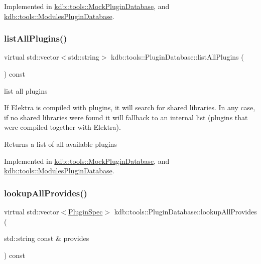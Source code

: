 Implemented in \mbox{\hyperlink{classkdb_1_1tools_1_1MockPluginDatabase_a5a701fd310be0e9f7d14a865c0226517}{kdb\+::tools\+::\+Mock\+Plugin\+Database}}, and \mbox{\hyperlink{classkdb_1_1tools_1_1ModulesPluginDatabase_a0e81e1b7b296a52f8040fd966b461c3a}{kdb\+::tools\+::\+Modules\+Plugin\+Database}}.

\mbox{\label{classkdb_1_1tools_1_1PluginDatabase_adc1f43ccefdd7fc15a57db7571420642}} 
\subsubsection{\texorpdfstring{listAllPlugins()}{listAllPlugins()}}
{\footnotesize\ttfamily virtual std\+::vector$<$std\+::string$>$ kdb\+::tools\+::\+Plugin\+Database\+::list\+All\+Plugins (\begin{DoxyParamCaption}{ }\end{DoxyParamCaption}) const\hspace{0.3cm}{\ttfamily [pure virtual]}}



list all plugins 

If Elektra is compiled with plugins, it will search for shared libraries. In any case, if no shared libraries were found it will fallback to an internal list (plugins that were compiled together with Elektra).

\begin{DoxyReturn}{Returns}
a list of all available plugins 
\end{DoxyReturn}


Implemented in \mbox{\hyperlink{classkdb_1_1tools_1_1MockPluginDatabase_a3663848683953bfad7123c48c00ab404}{kdb\+::tools\+::\+Mock\+Plugin\+Database}}, and \mbox{\hyperlink{classkdb_1_1tools_1_1ModulesPluginDatabase_a3fa5a08caf47cb79f9889641a96f197b}{kdb\+::tools\+::\+Modules\+Plugin\+Database}}.

\mbox{\label{classkdb_1_1tools_1_1PluginDatabase_a3ed261ad8562c423b64cf34cbc086161}} 
\subsubsection{\texorpdfstring{lookupAllProvides()}{lookupAllProvides()}}
{\footnotesize\ttfamily virtual std\+::vector$<$\mbox{\hyperlink{classkdb_1_1tools_1_1PluginSpec}{Plugin\+Spec}}$>$ kdb\+::tools\+::\+Plugin\+Database\+::lookup\+All\+Provides (\begin{DoxyParamCaption}\item[{std\+::string const \&}]{provides }\end{DoxyParamCaption}) const\hspace{0.3cm}{\ttfamily [pure virtual]}}




